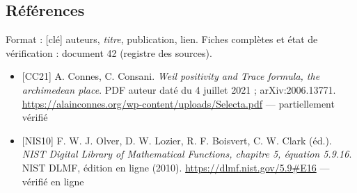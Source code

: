 \documentclass[
  10pt,
  a4paper,
]{article}
\providecommand{\tightlist}{%
  \setlength{\itemsep}{0pt}\setlength{\parskip}{0pt}}
\begin{document}
\hypertarget{ruxe9fuxe9rences}{%
\subsection{Références}\label{ruxe9fuxe9rences}}

Format : {[}clé{]} auteurs, \emph{titre}, publication, lien. Fiches
complètes et état de vérification : document 42 (registre des sources).

\begin{itemize}
\tightlist
\item
  {[}CC21{]} A. Connes, C. Consani. \emph{Weil positivity and Trace
  formula, the archimedean place}. PDF auteur daté du 4 juillet 2021 ;
  arXiv:2006.13771.
  \url{https://alainconnes.org/wp-content/uploads/Selecta.pdf} ---
  partiellement vérifié
\item
  {[}NIS10{]} F. W. J. Olver, D. W. Lozier, R. F. Boisvert, C. W. Clark
  (éd.). \emph{NIST Digital Library of Mathematical Functions, chapitre
  5, équation 5.9.16}. NIST DLMF, édition en ligne (2010).
  \url{https://dlmf.nist.gov/5.9\#E16} --- vérifié en ligne
\end{itemize}
\end{document}
